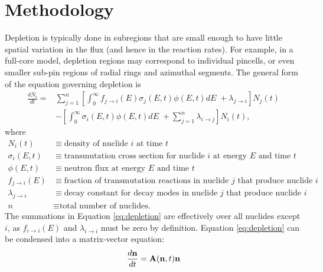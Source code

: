 \section{Methodology}
    \label{sec:methods}
    Depletion is typically done in subregions that are small enough to have
    little spatial variation in the flux (and hence in the reaction rates). For
    example, in a full-core model, depletion regions may correspond to
    individual pincells, or even smaller sub-pin regions of radial rings and
    azimuthal segments. The general form of the equation governing depletion is
    \begin{equation}
      \label{eq:depletion}
      \begin{split}
        \frac{dN_i}{dt} = &\sum\limits_{j=1}^n \left[ \int_0^\infty 
        f_{j \rightarrow i}(E) \sigma_j (E, t) \phi(E,t) dE \;+ \lambda_{j\rightarrow i}
        \right] N_j(t) \\ &- \left [\int_0^\infty \sigma_i (E,t) \phi(E,t) dE \; +
        \sum\limits_{j=1}^n \lambda_{i\rightarrow j} \right ] N_i(t),
      \end{split}
    \end{equation}
    where
    \begin{equation*}
      \begin{split}
        N_i(t) &\equiv \text{density of nuclide $i$ at time $t$} \\
        \sigma_i(E,t) &\equiv \text{transmutation cross section for nuclide $i$ at energy $E$ and time $t$} \\
        \phi(E,t) &\equiv \text{neutron flux at energy $E$ and time $t$} \\
        f_{j \rightarrow i}(E) &\equiv \text{fraction of transmutation reactions in nuclide $j$ that produce nuclide $i$} \\
        \lambda_{j \rightarrow i} &\equiv \text{decay constant for decay modes in nuclide $j$ that produce nuclide $i$} \\
        n &\equiv \text{total number of nuclides.}
      \end{split}
    \end{equation*}
    The summations in Equation \ref{eq:depletion} are effectively over all
    nuclides except $i$, as $f_{i \rightarrow i}(E)$ and $\lambda_{i \rightarrow i}$ must
    be zero by definition. Equation \ref{eq:depletion} can be condensed into a
    matrix-vector equation:
    \begin{equation}
      \label{eq:depletion-matrix-t}
      \frac{d\mathbf{n}}{dt} = \mathbf{A}(\mathbf{n},t)\mathbf{n}
    \end{equation}
